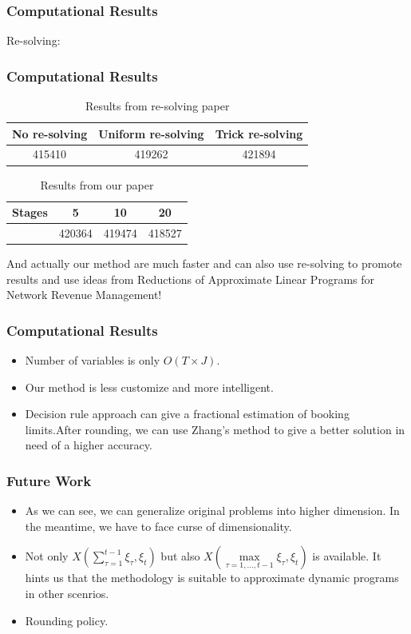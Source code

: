 \documentclass{beamer}
\begin{document}
\begin{frame}
\frametitle{Computational Results}
Re-solving:

%

\end{frame}

\begin{frame}
\frametitle{Computational Results}
\centering
\begin{table}
\begin{tabular}{ccc}
No re-solving &Uniform re-solving&Trick re-solving\\
\hline
415410 &419262& 421894 
\end{tabular}
\caption{Results from re-solving paper}
\end{table}
\begin{table}
\begin{tabular}{cccc}
Stages& 5 & 10 & 20 \\
\hline
& 420364 & 419474&418527
\end{tabular}
\caption{Results from our paper}
\end{table}
And actually our method are much faster and can also use re-solving to promote results and use ideas from Reductions of Approximate Linear Programs for Network Revenue Management!
\end{frame}

\begin{frame}
\frametitle{Computational Results}
\begin{itemize}
\item
Number of variables is only $O(T\times J)$.
\item Our method is less customize and more intelligent.
\item
Decision rule approach can give a fractional estimation of booking limits.After rounding, we can use Zhang's method to give a better solution in need of a higher accuracy.
\end{itemize}
\end{frame}
\begin{frame}
\frametitle{Future Work}
\begin{itemize}
\item As we can see, we can generalize original problems into higher dimension. In the meantime, we have to face curse of dimensionality.
\item Not only $X(\sum\limits_{\tau=1}^{t-1} \xi_\tau,\xi_t)$ but also $X(\max\limits_{\tau=1,\ldots,t-1}\xi_\tau,\xi_t)$ is available. It hints us that the
methodology is suitable to approximate dynamic programs in other scenrios.
\item Rounding policy.
\end{itemize}
\end{frame}
\end{document}
